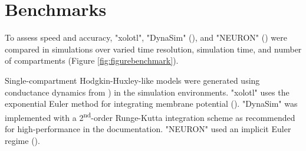 \documentclass{frontiersSCNS} %
\begin{document}
%
%
%
%

%
%
%
%
%
%

\section{Benchmarks}
\label{benchmarks}

To assess speed and accuracy, "xolotl", "DynaSim" (\cite{sherfeyDynaSimMATLABToolbox2018}), and "NEURON" (\cite{hinesNEURONSimulationEnvironment1997}) were compared in simulations over varied time resolution,  simulation time, and number of compartments (Figure \ref{fig:figurebenchmark}).

Single-compartment Hodgkin-Huxley-like models were generated using conductance dynamics from \cite{liuModelNeuronActivitydependent1998}) in the simulation environments. "xolotl" uses the exponential Euler method for integrating membrane potential (\cite{dayanTheoreticalNeuroscience2001}). "DynaSim" was implemented with a 2\textsuperscript{nd}-order Runge-Kutta integration scheme as recommended for high-performance in the documentation. "NEURON" used an implicit Euler regime (\cite{hinesNEURONSimulationEnvironment1997}).
\end{document}
